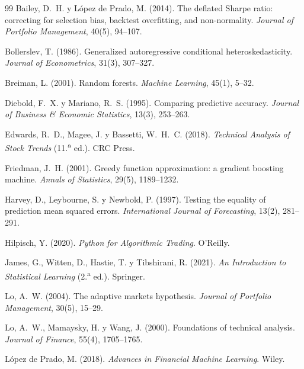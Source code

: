 \documentclass[10pt,a4paper]{article}
\begin{document}
\begin{thebibliography}{99}\small
\setlength{\itemsep}{2pt}
Bailey, D.~H. y López de Prado, M. (2014). The deflated Sharpe ratio: correcting
for selection bias, backtest overfitting, and non-normality. \textit{Journal of
Portfolio Management}, 40(5), 94--107.

Bollerslev, T. (1986). Generalized autoregressive conditional heteroskedasticity.
\textit{Journal of Econometrics}, 31(3), 307--327.

Breiman, L. (2001). Random forests. \textit{Machine Learning}, 45(1), 5--32.

Diebold, F.~X. y Mariano, R.~S. (1995). Comparing predictive accuracy.
\textit{Journal of Business \& Economic Statistics}, 13(3), 253--263.

Edwards, R.~D., Magee, J. y Bassetti, W.~H.~C. (2018). \textit{Technical Analysis
of Stock Trends} (11.\textsuperscript{a} ed.). CRC Press.

Friedman, J.~H. (2001). Greedy function approximation: a gradient boosting
machine. \textit{Annals of Statistics}, 29(5), 1189--1232.

Harvey, D., Leybourne, S. y Newbold, P. (1997). Testing the equality of prediction
mean squared errors. \textit{International Journal of Forecasting}, 13(2), 281--291.

Hilpisch, Y. (2020). \textit{Python for Algorithmic Trading}. O'Reilly.

James, G., Witten, D., Hastie, T. y Tibshirani, R. (2021). \textit{An Introduction
to Statistical Learning} (2.\textsuperscript{a} ed.). Springer.

Lo, A.~W. (2004). The adaptive markets hypothesis. \textit{Journal of Portfolio
Management}, 30(5), 15--29.

Lo, A.~W., Mamaysky, H. y Wang, J. (2000). Foundations of technical analysis.
\textit{Journal of Finance}, 55(4), 1705--1765.

López de Prado, M. (2018). \textit{Advances in Financial Machine Learning}. Wiley.


\end{thebibliography}
\end{document}
